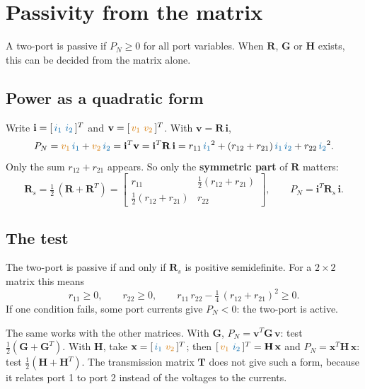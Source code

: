 \documentclass[11pt,a4paper]{article}
\newcommand{\Icol}[1]{\textcolor{ccur}{#1}}
\newcommand{\Vcol}[1]{\textcolor{cvolt}{#1}}
\newcommand{\vone}{\Vcol{v_1}}  \newcommand{\vtwo}{\Vcol{v_2}}
\newcommand{\ione}{\Icol{i_1}}  \newcommand{\itwo}{\Icol{i_2}}
\newcommand{\Rm}{\mathbf{R}}  \newcommand{\Gm}{\mathbf{G}}
\newcommand{\Hm}{\mathbf{H}}  \newcommand{\Tm}{\mathbf{T}}
\begin{document}
\clearpage
\appendix
\section{Passivity from the matrix}

A two-port is passive if $P_N \geq 0$ for all port variables. When $\Rm$, $\Gm$ or $\Hm$ exists,
this can be decided from the matrix alone.

\subsection{Power as a quadratic form}

Write $\mathbf{i} = [\,\ione \ \itwo\,]^T$ and $\mathbf{v} = [\,\vone \ \vtwo\,]^T$. With
$\mathbf{v} = \Rm\,\mathbf{i}$,
\[
  P_N = \vone\,\ione + \vtwo\,\itwo = \mathbf{i}^T\mathbf{v} = \mathbf{i}^T \Rm\,\mathbf{i}
      = r_{11}\,\ione^2 + (r_{12} + r_{21})\,\ione\,\itwo + r_{22}\,\itwo^2 .
\]
Only the sum $r_{12} + r_{21}$ appears. So only the \textbf{symmetric part} of $\Rm$ matters:
\[
  \Rm_s = \tfrac12\,(\Rm + \Rm^T)
        = \begin{bmatrix} r_{11} & \tfrac12(r_{12} + r_{21})\\[2pt]
                          \tfrac12(r_{12} + r_{21}) & r_{22} \end{bmatrix},
  \qquad P_N = \mathbf{i}^T \Rm_s\,\mathbf{i} .
\]

\subsection{The test}

\begin{ideabox}
The two-port is passive if and only if $\Rm_s$ is positive semidefinite. For a $2 \times 2$
matrix this means
\[
  r_{11} \geq 0, \qquad r_{22} \geq 0, \qquad
  r_{11}\,r_{22} - \tfrac14\,(r_{12} + r_{21})^2 \geq 0 .
\]
If one condition fails, some port currents give $P_N < 0$: the two-port is active.
\end{ideabox}

The same works with the other matrices. With $\Gm$, $P_N = \mathbf{v}^T \Gm\,\mathbf{v}$: test
$\frac12(\Gm + \Gm^T)$. With $\Hm$, take $\mathbf{x} = [\,\ione \ \vtwo\,]^T$; then
$[\,\vone \ \itwo\,]^T = \Hm\,\mathbf{x}$ and $P_N = \mathbf{x}^T \Hm\,\mathbf{x}$: test
$\frac12(\Hm + \Hm^T)$. The transmission matrix $\Tm$ does not give such a form, because it
relates port 1 to port 2 instead of the voltages to the currents.
\end{document}
